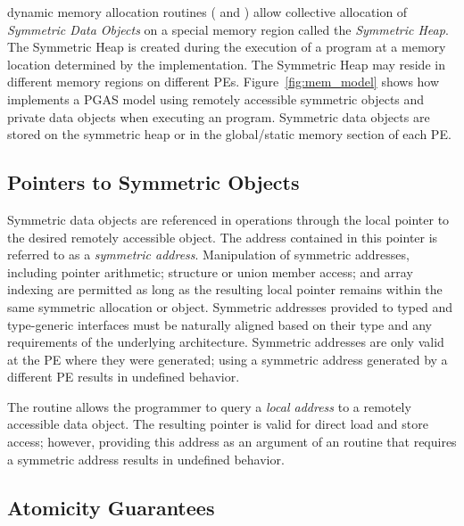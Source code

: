 \openshmem dynamic memory allocation routines ( and
) allow collective allocation of \emph{Symmetric Data
Objects} on a special memory region called the \emph{Symmetric Heap}. The
Symmetric Heap is created during the execution of a program at a memory location
determined by the implementation. The Symmetric Heap may reside in different
memory regions on different \acp{PE}. Figure~\ref{fig:mem_model} shows how
\openshmem implements a \ac{PGAS} model using remotely accessible symmetric
objects and private data objects when executing an \openshmem program.
Symmetric data objects are stored on the symmetric heap or in the global/static
memory section of each \ac{PE}. 

\subsection{Pointers to Symmetric Objects}

Symmetric data objects are referenced in \openshmem operations through the
local pointer to the desired remotely accessible object.  The address contained
in this pointer is referred to as a {\em symmetric address}.  Manipulation of
symmetric addresses, including pointer arithmetic; structure or union member
access; and array indexing are permitted as long as the resulting local pointer
remains within the same symmetric allocation or object.  Symmetric addresses
provided to typed and type-generic \openshmem interfaces must be naturally
aligned based on their type and any requirements of the underlying
architecture.  Symmetric addresses are only valid at the \ac{PE} where they
were generated; using a symmetric address generated by a different \ac{PE}
results in undefined behavior.

The  routine allows the programmer to query a {\em local
address} to a remotely accessible data object.  The resulting pointer is valid
for direct load and store access; however, providing this address as an
argument of an \openshmem routine that requires a symmetric address results in
undefined behavior.

\subsection{Atomicity Guarantees}\label{subsec:amo_guarantees}

